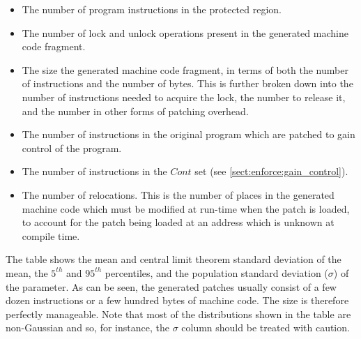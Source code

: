 \begin{itemize}
\item The number of program instructions in the protected region.
\item The number of lock and unlock operations present in the
  generated machine code fragment.
\item The size the generated machine code fragment, in terms of both
  the number of instructions and the number of bytes.  This is further
  broken down into the number of instructions needed to acquire the
  lock, the number to release it, and the number in other forms of
  patching overhead.
\item The number of instructions in the original program which are
  patched to gain control of the program.
\item The number of instructions in the $\mathit{Cont}$ set (see
  \autoref{sect:enforce:gain_control}).
\item The number of relocations.  This is the number of places in the
  generated machine code which must be modified at run-time when the
  patch is loaded, to account for the patch being loaded at an address
  which is unknown at compile time.
\end{itemize}

The table shows the mean and central limit theorem standard deviation
of the mean, the $5^{th}$ and $95^{th}$ percentiles, and the
population standard deviation ($\sigma$) of the parameter.  As can be
seen, the generated patches usually consist of a few dozen
instructions or a few hundred bytes of machine code.  The size is
therefore perfectly manageable.  Note that most of the distributions
shown in the table are non-Gaussian and so, for instance, the $\sigma$
column should be treated with caution.

